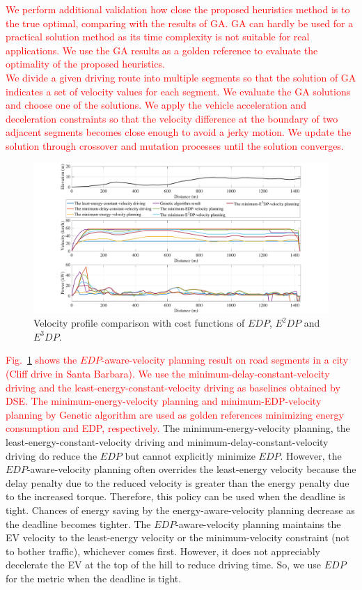 \documentclass{IEEEtran}
\begin{document}
\textcolor{red}{We perform additional validation how close the proposed heuristics method is to the true optimal, comparing with the results of GA. GA can hardly be used for a practical solution method as its time complexity is not suitable for real applications. We use the GA results as a golden reference to evaluate the optimality of the proposed heuristics.\\
%
We divide a given driving route into multiple segments so that the solution of GA indicates a set of velocity values for each segment. We evaluate the GA solutions and choose one of the solutions. We apply the vehicle acceleration and deceleration constraints so that the velocity difference at the boundary of two adjacent segments becomes close enough to avoid a jerky motion. We update the solution through crossover and mutation processes until the solution converges.} 

\begin{figure} %
\centering
\includegraphics[width=0.9\hsize]{Figures/EDP_comp_profile.pdf}
\caption{Velocity profile comparison with cost functions of $EDP$, $E^2DP$ and $E^3DP$.}
\label{fig:EDP_aware_velocity_planning}
\end{figure} 

\textcolor{red}{Fig.~\ref{fig:EDP_aware_velocity_planning} shows the $EDP$-aware-velocity planning result on road segments in a city (Cliff drive in Santa Barbara). We use the minimum-delay-constant-velocity driving and the least-energy-constant-velocity driving as baselines obtained by DSE. The minimum-energy-velocity planning and minimum-EDP-velocity planning by Genetic algorithm are used as golden references minimizing energy consumption and EDP, respectively.}
%
The minimum-energy-velocity planning, the least-energy-constant-velocity driving and minimum-delay-constant-velocity driving do reduce the $EDP$ but cannot explicitly minimize $EDP$. However, the $EDP$-aware-velocity planning often overrides the least-energy velocity because the delay penalty due to the reduced velocity is greater than the energy penalty due to the increased torque. Therefore, this policy can be used when the deadline is tight. Chances of energy saving by the energy-aware-velocity planning decrease as the deadline becomes tighter. 
%
The $EDP$-aware-velocity planning maintains the EV velocity to the least-energy velocity or the minimum-velocity constraint (not to bother traffic), whichever comes first. However, it does not appreciably decelerate the EV at the top of the hill to reduce driving time. So, we use $EDP$ for the metric when the deadline is tight. 
\end{document}
